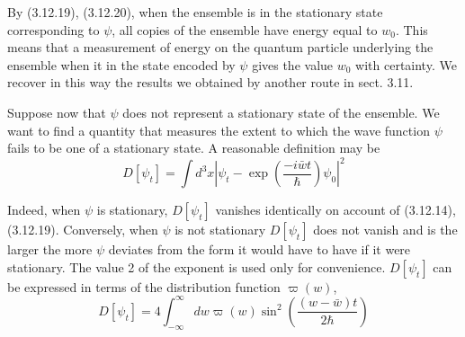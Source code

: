 \documentclass{article}
\begin{document}
By (3.12.19), (3.12.20), when the ensemble is in the stationary state corresponding to $\psi$, all copies of the ensemble have energy equal to $w_{0}$. This means that a measurement of energy on the quantum particle underlying the ensemble when it in the state encoded by $\psi$ gives the value $w_{0}$ with certainty. We recover in this way the results we obtained by another route in sect. 3.11.

Suppose now that $\psi$ does not represent a stationary state of the ensemble. We want to find a quantity that measures the extent to which the wave function $\psi$ fails to be one of a stationary state. A reasonable definition may be
$$
\begin{equation*}
D\left[\psi_{t}\right]=\int d^{3} x\left|\psi_{t}-\exp \left(\frac{-i \bar{w} t}{\hbar}\right) \psi_{0}\right|^{2} \tag{3.12.23}
\end{equation*}
$$

Indeed, when $\psi$ is stationary, $D\left[\psi_{t}\right]$ vanishes identically on account of (3.12.14), (3.12.19). Conversely, when $\psi$ is not stationary $D\left[\psi_{t}\right]$ does not vanish and is the larger the more $\psi$ deviates from the form it would have to have if it were stationary. The value 2 of the exponent is used only for convenience. $D\left[\psi_{t}\right]$ can be expressed in terms of the distribution function $\varpi(w)$,
$$
\begin{equation*}
D\left[\psi_{t}\right]=4 \int_{-\infty}^{\infty} d w \varpi(w) \sin ^{2}\left(\frac{(w-\bar{w}) t}{2 \hbar}\right) \tag{3.12.24}
\end{equation*}
$$
\end{document}

